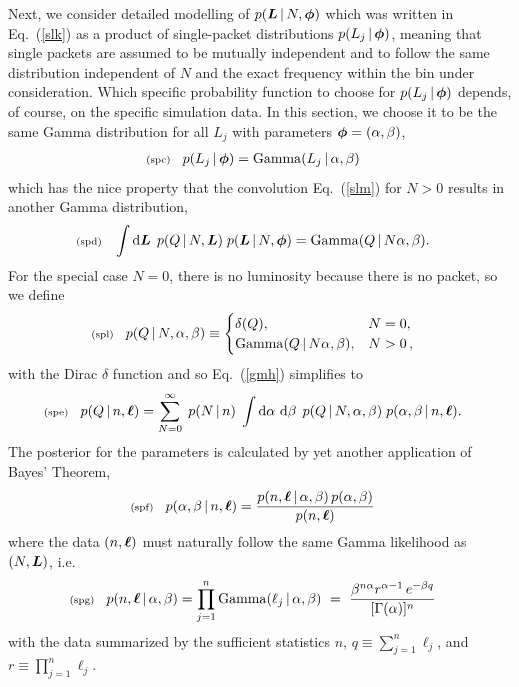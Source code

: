 \documentclass[11pt]{article}
\newcommand{\lleq}[1]{\label{#1} }
\renewcommand{\lleq}[1]{\label{#1} {\scriptstyle {\rm (#1)}} \hspace*{2ex} }
\newcommand{\cond}{\,|\,}
\newcommand{\refeq}[1]{Eq.~(\ref{#1})}
\DeclareMathOperator{\GammaDist}{Gamma}
\newcommand{\rmdx}[1]{\dd{#1}} %
\begin{document}
Next, we consider detailed modelling of $p(\bmL\cond N,\bmphi)$ which
was written in Eq.~(\ref{slk}) as a product of single-packet
distributions $p(L_j\cond \bmphi)$, meaning that single packets are
assumed to be mutually independent and to follow the same distribution
independent of $N$ and the exact frequency within the bin under consideration.
%
Which specific probability function to choose for $p(L_j\cond\bmphi)$
depends, of course, on the specific simulation data. In this section,
we choose it to be the same Gamma distribution for all $L_j$
with parameters ${\bm{\phi}} = (\alpha,\beta)$,
\begin{align}
  \lleq{spc}
  p(L_j\cond \bmphi) &= \GammaDist(L_j\cond \alpha,\beta)
\end{align}
which has the nice property that the convolution \refeq{slm} for
$N > 0$ results in another Gamma distribution,
\begin{align}
  \lleq{spd}
  \int \rmdx{\bmL}\; p(Q\cond N,\bmL)\; p(\bmL\cond N,\bmphi)
  &= \GammaDist(Q\cond N\alpha, \beta).
\end{align}
For the special case $N=0$, there is no luminosity because there is no
packet, so we define
\begin{align}
  \lleq{spl}
   p(Q\cond N, \alpha, \beta) &\equiv
   \begin{cases}
     \delta(Q),     &N=0,\\
     \GammaDist(Q\cond N\alpha, \beta), & N > 0 \, ,
   \end{cases}
 \end{align}
 with the Dirac $\delta$ function and so \refeq{gmh} simplifies to
\begin{align}
  \lleq{spe}
  p(Q\cond n,\bml)
  &= \sum_{N=0}^\infty \;
    p(N\cond n)\;
    \int \rmdx{\alpha}\,\rmdx{\beta}\;
    p(Q\cond N, \alpha, \beta)\;
    p(\alpha,\beta\cond n,\bml).
\end{align}
The posterior for the parameters is calculated by yet another
application of Bayes' Theorem,
\begin{align}
  \lleq{spf}
  p(\alpha,\beta\cond n,\bml)
  &= \frac{p(n,\bml\cond \alpha,\beta)\,p(\alpha,\beta)}{p(n,\bml)}
\end{align}
where the data $(n,{\bm{\ell}})$ must naturally follow the same
Gamma likelihood as $(N,{\bm{L}})$, i.e.\
\begin{align}
  \lleq{spg}
  p(n,\bml\cond \alpha,\beta)
  & = \prod_{j=1}^n \GammaDist(\ell_j\cond\alpha,\beta)
    \ =\ \frac{\beta^{n\alpha} r^{\alpha-1}\,e^{-\beta q}}{[\Gamma(\alpha)]^n}
\end{align}
with the data summarized by the sufficient statistics $n$,
$q \equiv \sum_{j=1}^n \ell_j$, and $r \equiv \prod_{j=1}^n \ell_j$.
\end{document}
